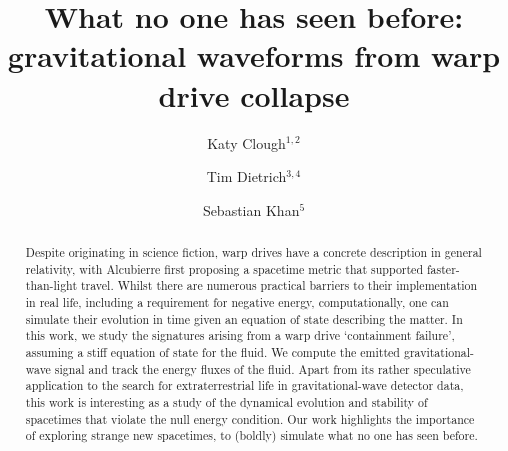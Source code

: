 \documentclass[twocolumn, numberedappendix, twocolappendix,apj, iop, a4paper]{openjournal}
\begin{document}
\title{What no one has seen before: gravitational waveforms from warp drive collapse}

\author[0000-0001-8841-1522]{
 Katy Clough$^{1,2}$}
\author[0000-0003-2374-307X]{Tim Dietrich$^{3,4}$}
\author[0000-0003-4953-5754]{Sebastian Khan$^{5}$}

\address{$^1$ School of Mathematical 
Sciences, Queen Mary University of London, Mile End Road, London E1 4NS, 
United Kingdom}
\address{$^2$ Astrophysics, University of Oxford, DWB, Keble Road, Oxford OX1 3RH, UK}
\address{$^3$ Institut f\"ur Physik und Astronomie, Universit\"at Potsdam, Haus 28, 
              Karl-Liebknecht-Str. 24/25, 14476, Potsdam, Germany}
\address{$^4$Max Planck Institute for Gravitational Physics (Albert Einstein Institute), Am M\"uhlenberg 1, Potsdam 14476, Germany}
\address{$^5$ School of Physics and Astronomy, Cardiff University, Queens Buildings, Cardiff, CF24 3AA, United Kingdom}


\begin{abstract}
Despite originating in science fiction, warp drives have a concrete description in general relativity, with Alcubierre first proposing a spacetime metric that supported faster-than-light travel. Whilst there are numerous practical barriers to their implementation in real life, including a requirement for negative energy, computationally, one can simulate their evolution in time given an equation of state describing the matter. In this work, we study the signatures arising from a warp drive `containment failure', assuming a stiff equation of state for the fluid. We compute the emitted gravitational-wave signal and track the energy fluxes of the fluid. Apart from its rather speculative application to the search for extraterrestrial life in gravitational-wave detector data, this work is interesting as a study of the dynamical evolution and stability of spacetimes that violate the null energy condition. Our work highlights the importance of exploring strange new spacetimes, to (boldly) simulate what no one has seen before.
\end{abstract}

\maketitle
\end{document}
